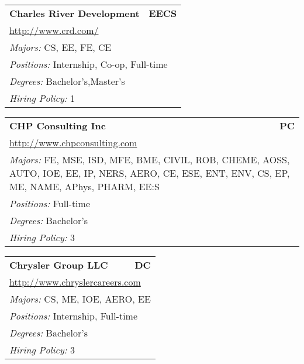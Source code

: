 \documentclass[twoside]{article}
\begin{document}
\begin{center}
\begin{multicols}{3}
\begin{FlushLeft}
\begin{minipage}{.9\columnwidth}
\end{minipage}
 
\begin{minipage}{.9\columnwidth}\begin{tabularx}{.95\columnwidth}{Xr}
                 {\Large\bf Charles River Development} & {\Large\bf EECS}\\
    \multicolumn{2}{p{.95\columnwidth}}{\url{http://www.crd.com/}}\\
    \multicolumn{2}{p{.95\columnwidth}}{\emph{Majors:} CS, EE, FE, CE}\\
    \multicolumn{2}{p{.95\columnwidth}}{\emph{Positions:} Internship, Co-op, Full-time}\\
    \multicolumn{2}{p{.95\columnwidth}}{\emph{Degrees:} Bachelor's,Master's}\\
    \multicolumn{2}{p{.95\columnwidth}}{\emph{Hiring Policy:} 1}\\
    \end{tabularx}
    
\end{minipage}
 
\begin{minipage}{.9\columnwidth}\begin{tabularx}{.95\columnwidth}{Xr}
                 {\Large\bf CHP Consulting Inc} & {\Large\bf PC}\\
    \multicolumn{2}{p{.95\columnwidth}}{\url{http://www.chpconsulting.com}}\\
    \multicolumn{2}{p{.95\columnwidth}}{\emph{Majors:} FE, MSE, ISD, MFE, BME, CIVIL, ROB, CHEME, AOSS, AUTO, IOE, EE, IP, NERS, AERO, CE, ESE, ENT, ENV, CS, EP, ME, NAME, APhys, PHARM, EE:S}\\
    \multicolumn{2}{p{.95\columnwidth}}{\emph{Positions:} Full-time}\\
    \multicolumn{2}{p{.95\columnwidth}}{\emph{Degrees:} Bachelor's}\\
    \multicolumn{2}{p{.95\columnwidth}}{\emph{Hiring Policy:} 3}\\
    \end{tabularx}
    
\end{minipage}
 
\begin{minipage}{.9\columnwidth}\begin{tabularx}{.95\columnwidth}{Xr}
                 {\Large\bf Chrysler Group LLC} & {\Large\bf DC}\\
    \multicolumn{2}{p{.95\columnwidth}}{\url{http://www.chryslercareers.com}}\\
    \multicolumn{2}{p{.95\columnwidth}}{\emph{Majors:} CS, ME, IOE, AERO, EE}\\
    \multicolumn{2}{p{.95\columnwidth}}{\emph{Positions:} Internship, Full-time}\\
    \multicolumn{2}{p{.95\columnwidth}}{\emph{Degrees:} Bachelor's}\\
    \multicolumn{2}{p{.95\columnwidth}}{\emph{Hiring Policy:} 3}\\
    \end{tabularx}
    

\end{minipage}
\end{FlushLeft}
\end{multicols}
\end{center}
\end{document}
